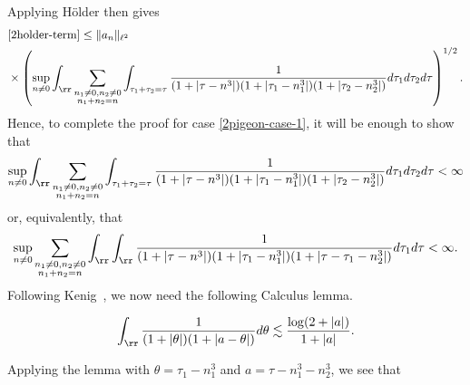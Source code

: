 %
Applying H{\"o}lder then gives
%
%
\begin{equation*}
	\begin{split}
		& \eqref{2holder-term}
		 \le \| a_{n} \|_{\ell^2}
		\\
		& \times \left( \sup_{n \neq 0} \int_{\rr}
		\sum_{\substack{n_1 \neq 0, n_2 \neq 0 \\n_1 +n_2 =n}} \int_{\tau_1 + \tau_2
		= \tau} \frac{1}{(1 + | \tau - n^{3} |)(1 + |
		\tau_{1}-n_{1}^{3} |)(1 + | \tau_2 -n_{2}^{3} |)} d \tau_1 d \tau_2 d \tau
		\right)^{1/2}.
	\end{split}
\end{equation*}
%
%
Hence, to complete the proof for case \eqref{2pigeon-case-1}, it will be enough
to show that 
%
%
%
%
\begin{equation*}
	\begin{split}
		 \sup_{n \neq 0} \int_{\rr}
		\sum_{\substack{n_1 \neq 0, n_2 \neq 0 \\n_1 +n_2 =n}} \int_{\tau_1 + \tau_2
		= \tau} \frac{1}{(1 + | \tau - n^{3} |)(1 + |
		\tau_{1}-n_{1}^{3} |)(1 + | \tau_2 -n_{2}^{3} |)} d \tau_1 d \tau_2 d \tau <\infty
	\end{split}
\end{equation*}
%
%
or, equivalently, that
%
%
\begin{equation}
	\label{212g}
	\begin{split}
		\sup_{n \neq 0} \sum_{\substack{n_1 \neq 0, n_2 \neq 0 \\n_1 +n_2 =n}} \int_{\rr}
		\int_\rr  \frac{1}{(1 + | \tau - n^{3} |)(1 + | \tau_1 - n_{1}^{3} |)(1 + | \tau - \tau_1 -
		n_2^3 |)} d \tau_1 d \tau < \infty.
	\end{split}
\end{equation}
%
%
Following Kenig~\cite{Kenig:1996aa}, we now need the following Calculus lemma.
%
%
%
%
%
%
%
%
\begin{lemma}
	\label{2lem:calc}
 \begin{equation}
	 \label{2calc}
	 \begin{split}
		 \int_{\rr} \frac{1}{(1 + | \theta |)(1 + | a - \theta |)} d \theta \lesssim
		 \frac{\log(2 + | a |)}{1 + | a |}.
	 \end{split}
 \end{equation}
 \end{lemma}
%
%
Applying the lemma with $\theta = \tau_1 - n_1^3$ and $a = \tau - n_1^3 -
n_2^3$, we see that
